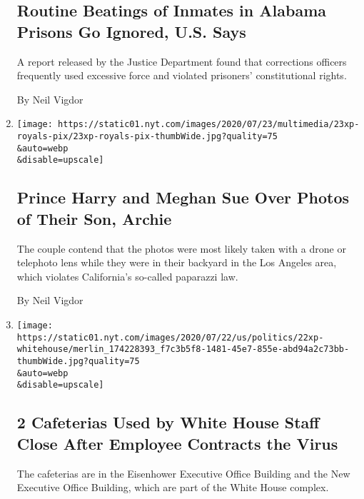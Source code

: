 \begin{enumerate}
  \hypertarget{routine-beatings-of-inmates-in-alabama-prisons-go-ignored-us-says}{%
  \subsection{Routine Beatings of Inmates in Alabama Prisons Go Ignored,
  U.S.
  Says}\label{routine-beatings-of-inmates-in-alabama-prisons-go-ignored-us-says}}

  A report released by the Justice Department found that corrections
  officers frequently used excessive force and violated prisoners'
  constitutional rights.

  By Neil Vigdor
\item
  \href{/2020/07/23/us/meghan-harry-paparazzi.html}{}

  \texttt{[image: https://static01.nyt.com/images/2020/07/23/multimedia/23xp-royals-pix/23xp-royals-pix-thumbWide.jpg?quality=75\\\&auto=webp\\\&disable=upscale]}

  \hypertarget{prince-harry-and-meghan-sue-over-photos-of-their-son-archie}{%
  \subsection{Prince Harry and Meghan Sue Over Photos of Their Son,
  Archie}\label{prince-harry-and-meghan-sue-over-photos-of-their-son-archie}}

  The couple contend that the photos were most likely taken with a drone
  or telephoto lens while they were in their backyard in the Los Angeles
  area, which violates California's so-called paparazzi law.

  By Neil Vigdor
\item
  \href{/2020/07/22/us/politics/white-house-employee-covid-19.html}{}

  \texttt{[image: https://static01.nyt.com/images/2020/07/22/us/politics/22xp-whitehouse/merlin\_174228393\_f7c3b5f8-1481-45e7-855e-abd94a2c73bb-thumbWide.jpg?quality=75\\\&auto=webp\\\&disable=upscale]}

  \hypertarget{2-cafeterias-used-by-white-house-staff-close-after-employee-contracts-the-virus}{%
  \subsection{2 Cafeterias Used by White House Staff Close After
  Employee Contracts the
  Virus}\label{2-cafeterias-used-by-white-house-staff-close-after-employee-contracts-the-virus}}

  The cafeterias are in the Eisenhower Executive Office Building and the
  New Executive Office Building, which are part of the White House
  complex.


\end{enumerate}
